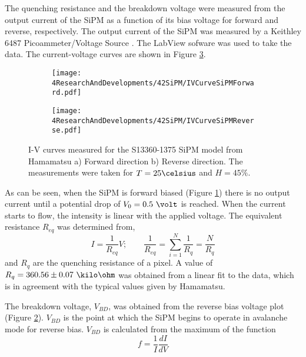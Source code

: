The quenching resistance and the breakdown voltage were measured from the output current of the SiPM as a function of its bias voltage for forward and reverse, respectively. The output current of the SiPM was measured by a Keithley 6487 Picoammeter/Voltage Source \cite{DataSheetKeithley6487}. The LabView sofware was used to take the data. The current-voltage curves are shown in Figure \ref{fig:IVcurveSiPM}.
\begin{figure}
\centering
    \begin{subfigure}[b]{0.9\textwidth}
    \centering
    \texttt{[image: 4ResearchAndDevelopments/42SiPM/IVCurveSiPMForward.pdf]}  
    \caption{\label{subfig:IVcurveForward}}
    \end{subfigure}
    \hfill
    \begin{subfigure}[b]{0.9\textwidth}
    \centering
    \texttt{[image: 4ResearchAndDevelopments/42SiPM/IVCurveSiPMReverse.pdf]}  
    \caption{\label{subfig:IVcurveReverse}}
    \end{subfigure}
 \caption{I-V curves measured for the S13360-1375 SiPM model from Hamamatsu a) Forward direction b) Reverse direction. The measurements were taken for $T=25\celsius$ and $H=45\%$.}
 \label{fig:IVcurveSiPM}
\end{figure}
As can be seen, when the SiPM is forward biased (Figure \ref{subfig:IVcurveForward}) there is no output current until a potential drop of $V_0= 0.5~\volt$ is reached. When the current starts to flow, the intensity is linear with the applied voltage. The equivalent resistance $R_{eq}$ was determined from, 
\begin{equation}
I=\frac{1}{R_{eq}}V;  \qquad \frac{1}{R_{eq}} = \sum_{i=1}^{N}\frac{1}{R_{q}}= \frac{N}{R_{q}}
\label{QuenchingResistance}
\end{equation}
and $R_{q}$ are the quenching resistance of a pixel. A value of $R_{q}= 360.56 \pm 0.07~\kilo\ohm$ was obtained from a linear fit to the data, which is in agreement with the typical values given by Hamamatsu.

The breakdown voltage, $V_{BD}$, was obtained from the reverse bias voltage plot (Figure \ref{subfig:IVcurveReverse}). $V_{BD}$ is the point at which the SiPM begins to operate in avalanche mode for reverse bias. $V_{BD}$ is calculated from the maximum of the function 
\begin{equation}
f=\frac{1}{I}\frac{dI}{dV}
\label{BreakDownVoltageFunction}
\end{equation}

